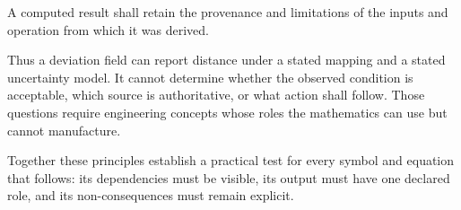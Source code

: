 \begin{principle}
\label{princ:derived-result-discipline}
A computed result shall retain the provenance and limitations of the
inputs and operation from which it was derived.
\end{principle}

Thus a deviation field can report distance under a stated mapping and a
stated uncertainty model. It cannot determine whether the observed
condition is acceptable, which source is authoritative, or what action
shall follow. Those questions require engineering concepts whose roles
the mathematics can use but cannot manufacture.

Together these principles establish a practical test for every symbol
and equation that follows: its dependencies must be visible, its output
must have one declared role, and its non-consequences must remain
explicit.

